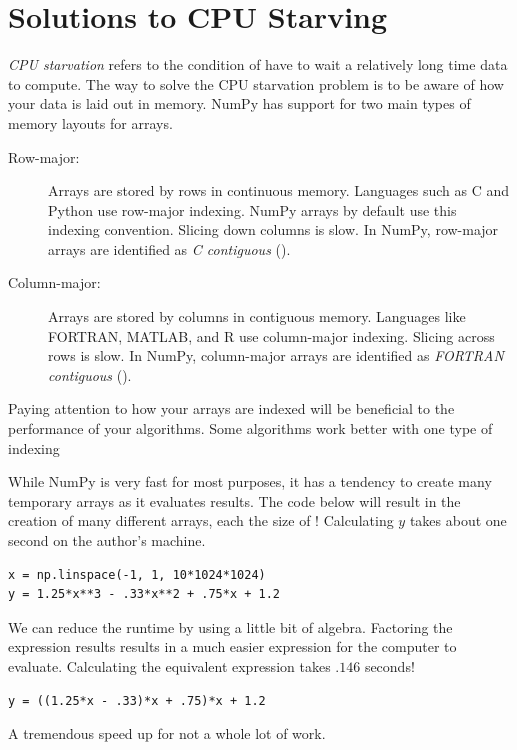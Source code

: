 \section*{Solutions to CPU Starving}
\emph{CPU starvation} refers to the condition of have to wait a relatively long time data to compute.
The way to solve the CPU starvation problem is to be aware of how your data is laid out in memory.
NumPy has support for two main types of memory layouts for arrays.
\begin{description}
\item[Row-major:] Arrays are stored by rows in continuous memory.
Languages such as C and Python use row-major indexing.  NumPy arrays by default use this indexing convention.
Slicing down columns is slow.  In NumPy, row-major arrays are identified as \emph{C contiguous} ().
\item[Column-major:] Arrays are stored by columns in contiguous memory.
Languages like FORTRAN, MATLAB, and R use column-major indexing.  Slicing across rows is slow.
In NumPy, column-major arrays are identified as \emph{FORTRAN contiguous} ().
\end{description}
Paying attention to how your arrays are indexed will be beneficial to the performance of your algorithms.
Some algorithms work better with one type of indexing

While NumPy is very fast for most purposes, it has a tendency to create many temporary arrays as it evaluates results.
The code below will result in the creation of many different arrays, each the size of !  
Calculating $y$ takes about one second on the author's machine.
\begin{lstlisting}
x = np.linspace(-1, 1, 10*1024*1024)
y = 1.25*x**3 - .33*x**2 + .75*x + 1.2
\end{lstlisting}
We can reduce the runtime by using a little bit of algebra.
Factoring the expression results results in a much easier expression for the computer to evaluate.
Calculating the equivalent expression takes $.146$ seconds!
\begin{lstlisting}
y = ((1.25*x - .33)*x + .75)*x + 1.2
\end{lstlisting}
A tremendous speed up for not a whole lot of work.

